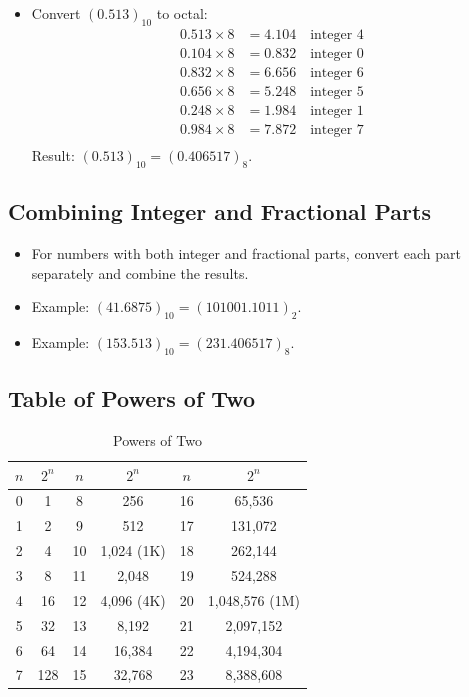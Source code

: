 \documentclass[a4paper,12pt]{article}
\begin{document}
\begin{itemize}
\begin{itemize}
			\item Convert $(0.513)_{10}$ to octal:
			\begin{align*}
				0.513 \times 8 &= 4.104 \quad \text{integer } 4 \\
				0.104 \times 8 &= 0.832 \quad \text{integer } 0 \\
				0.832 \times 8 &= 6.656 \quad \text{integer } 6 \\
				0.656 \times 8 &= 5.248 \quad \text{integer } 5 \\
				0.248 \times 8 &= 1.984 \quad \text{integer } 1 \\
				0.984 \times 8 &= 7.872 \quad \text{integer } 7 \\
			\end{align*}
			Result: $(0.513)_{10} = (0.406517)_8$.
		\end{itemize}
	\end{itemize}
	
	\subsection*{Combining Integer and Fractional Parts}
	\begin{itemize}
		\item For numbers with both integer and fractional parts, convert each part separately and combine the results.
		\item Example: $(41.6875)_{10} = (101001.1011)_2$.
		\item Example: $(153.513)_{10} = (231.406517)_8$.
	\end{itemize}
	
	\subsection*{Table of Powers of Two}
	\begin{table}[h!]
		\centering
		\begin{tabular}{cc|cc|cc}
			\toprule
			$n$ & $2^n$ & $n$ & $2^n$ & $n$ & $2^n$ \\
			\midrule
			0 & 1 & 8 & 256 & 16 & 65,536 \\
			1 & 2 & 9 & 512 & 17 & 131,072 \\
			2 & 4 & 10 & 1,024 (1K) & 18 & 262,144 \\
			3 & 8 & 11 & 2,048 & 19 & 524,288 \\
			4 & 16 & 12 & 4,096 (4K) & 20 & 1,048,576 (1M) \\
			5 & 32 & 13 & 8,192 & 21 & 2,097,152 \\
			6 & 64 & 14 & 16,384 & 22 & 4,194,304 \\
			7 & 128 & 15 & 32,768 & 23 & 8,388,608 \\
			\bottomrule
		\end{tabular}
		\caption{Powers of Two}
	\end{table}
\end{document}
